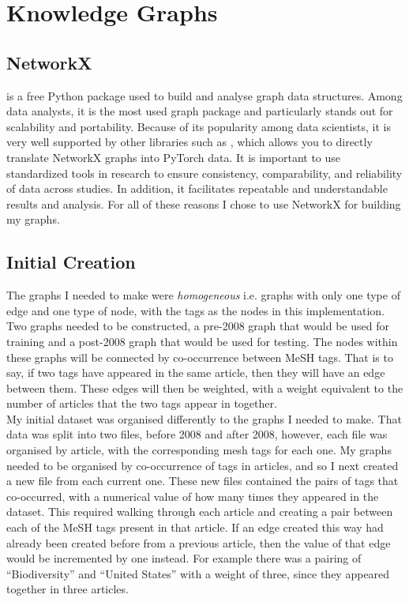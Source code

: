 \documentclass{l4proj}
\begin{document}
\section{Knowledge Graphs}

\subsection{NetworkX}

\cite{networkx} is a free Python package used to build and analyse graph data structures. Among data analysts, it is the most used graph package and particularly stands out for scalability and portability. Because of its popularity among data scientists, it is very well supported by other libraries such as \cite{pytorch}, which allows you to directly translate NetworkX graphs into PyTorch \cite{pytorch_geometric} data. It is important to use standardized tools in research to ensure consistency, comparability, and reliability of data across studies. In addition, it  facilitates repeatable and understandable results and analysis. For all of these reasons I chose to use NetworkX for building my graphs. \\

\subsection{Initial Creation}

The graphs I needed to make were \textit{homogeneous} i.e. graphs with only one type of edge and one type of node, with the tags as the nodes in this implementation. Two graphs needed to be constructed, a pre-2008 graph that would be used for training and a post-2008 graph that would be used for testing. The nodes within these graphs will be connected by co-occurrence between MeSH tags. That is to say, if two tags have appeared in the same article, then they will have an edge between them. These edges will then be weighted, with a weight equivalent to the number of articles that the two tags appear in together. \\

My initial dataset was organised differently to the graphs I needed to make. That  data was split into two files, before 2008 and after 2008, however, each file was organised by article, with the corresponding mesh tags for each one. My graphs needed to be organised by co-occurrence of tags in articles, and so I next created a new file from each current one. These new files contained the pairs of tags that co-occurred, with a numerical value of how many times they appeared in the dataset. This required walking through each article and creating a pair between each of the MeSH tags present in that article. If an edge created this way had already been created before from a previous article, then the value of that edge would be incremented by one instead. For example there was a pairing of ``Biodiversity'' and ``United States'' with a weight of three, since they appeared together in three articles. \\
\end{document}
